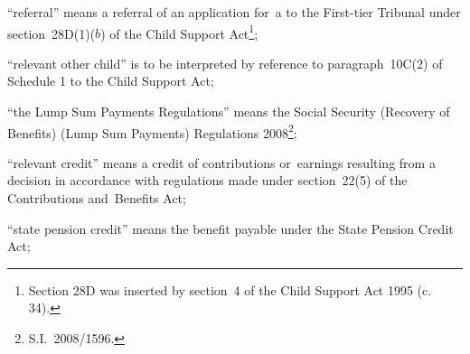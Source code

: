 \documentclass[12pt,a4paper]{article}
\begin{document}
\begin{enumerate}
“referral” means a referral of an application for~a 
%
%
to 
the First-tier Tribunal  %
under section~28D(1)($b$) of the Child Support Act\footnote{\frenchspacing Section 28D was inserted by section~4 of the Child Support Act 1995 (c. 34).};

“relevant other child” is to be interpreted by reference to paragraph~10C(2) of Schedule 1 to the Child Support Act;

“the Lump Sum Payments Regulations” means the Social Security (Recovery of Benefits) (Lump Sum Payments) Regulations 2008\footnote{S.I.~2008/1596.};


“relevant credit” means a credit of contributions or~earnings resulting from a decision in accordance with regulations made under section~22(5) of the Contributions and~Benefits Act;

“state pension credit” means the benefit payable under the State Pension Credit Act;


\end{enumerate}
\end{document}
